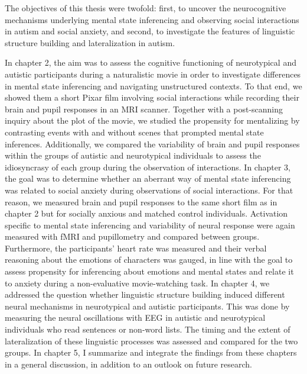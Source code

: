 The objectives of this thesis were twofold: first, to uncover the neurocognitive mechanisms underlying mental state inferencing and observing social interactions in autism and social anxiety, and second, to investigate the features of linguistic structure building and lateralization in autism. 

In chapter 2, the aim was to assess the cognitive functioning of neurotypical and autistic participants during a naturalistic movie in order to investigate differences in mental state inferencing and navigating unstructured contexts. To that end, we showed them a short Pixar film involving social interactions while recording their brain and pupil responses in an MRI scanner. Together with a post-scanning inquiry about the plot of the movie, we studied the propensity for mentalizing by contrasting events with and without scenes that prompted mental state inferences. Additionally, we compared the variability of brain and pupil responses within the groups of autistic and neurotypical individuals to assess the idiosyncrasy of each group during the observation of interactions. In chapter 3, the goal was to determine whether an aberrant way of mental state inferencing was related to social anxiety during observations of social interactions. For that reason, we measured brain and pupil responses to the same short film as in chapter 2 but for socially anxious and matched control individuals. Activation specific to mental state inferencing and variability of neural response were again measured with fMRI and pupillometry and compared between groups. Furthermore, the participants' heart rate was measured and their verbal reasoning about the emotions of characters was gauged, in line with the goal to assess propensity for inferencing about emotions and mental states and relate it to anxiety during a non-evaluative movie-watching task. In chapter 4, we addressed the question whether linguistic structure building induced different neural mechanisms in neurotypical and autistic participants. This was done by measuring the neural oscillations with EEG in autistic and neurotypical individuals who read sentences or non-word lists. The timing and the extent of lateralization of these linguistic processes was assessed and compared for the two groups. In chapter 5, I summarize and integrate the findings from these chapters in a general discussion, in addition to an outlook on future research.


